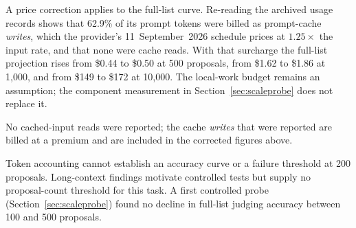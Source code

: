 
A price correction applies to the full-list curve. Re-reading the archived usage
records shows that 62.9\% of its prompt tokens were billed as prompt-cache
\emph{writes}, which the provider's 11~September~2026 schedule prices at
$1.25\times$ the input rate, and that none were cache reads. With that surcharge
the full-list projection rises from \$0.44 to \$0.50 at 500 proposals, from
\$1.62 to \$1.86 at 1,000, and from \$149 to \$172 at 10,000. The local-work
budget remains an assumption; the component measurement in
Section~\ref{sec:scaleprobe} does not replace it.

No cached-input reads were reported; the cache \emph{writes} that were reported
are billed at a premium and are included in the corrected figures above.

Token accounting cannot establish an accuracy curve or a failure threshold at
200 proposals. Long-context findings motivate controlled tests
\citep{liu2024lost} but supply no proposal-count threshold for this task. A
first controlled probe (Section~\ref{sec:scaleprobe}) found no decline in
full-list judging accuracy between 100 and 500 proposals.

